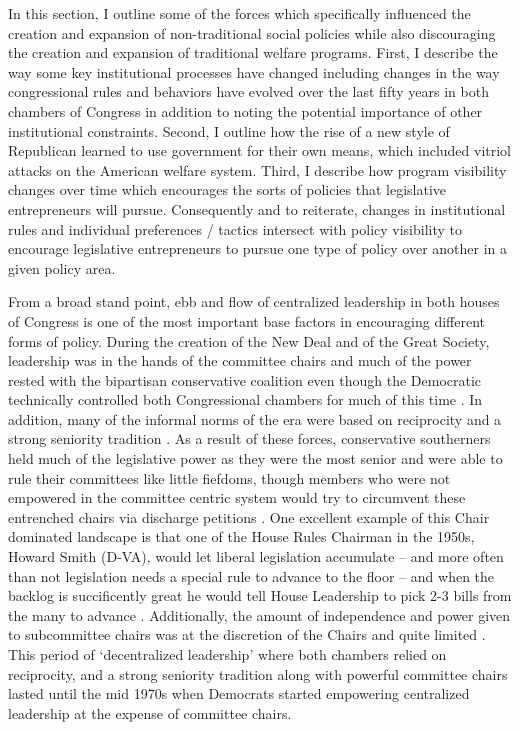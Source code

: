 \documentclass[12pt]{article}
\begin{document}
In this section, I outline some of the forces which specifically influenced the creation and expansion of non-traditional social policies while also discouraging the creation and expansion of traditional welfare programs. First, I describe the way some key institutional processes have changed including changes in the way congressional rules and behaviors have evolved over the last fifty years in both chambers of Congress in addition to noting the potential importance of other institutional constraints. Second, I outline how the rise of a new style of Republican learned to use government for their own means, which included vitriol attacks on the American welfare system. Third, I describe how program visibility changes over time which encourages the sorts of policies that legislative entrepreneurs will pursue. Consequently and to reiterate, changes in institutional rules and individual preferences / tactics intersect with policy visibility to encourage legislative entrepreneurs to pursue one type of policy over another in a given policy area.

From a broad stand point, ebb and flow of centralized leadership in both houses of Congress is one of the most important base factors in encouraging different forms of policy. During the creation of the New Deal and of the Great Society, leadership was in the hands of the committee chairs and much of the power rested with the bipartisan conservative coalition even though the Democratic technically controlled both Congressional chambers for much of this time \citep{shelley1983, shepsle1989, polsby2004}. In addition, many of the informal norms of the era were based on reciprocity and a strong seniority tradition \citep{matthews1960, asher1973}. As a result of these forces, conservative southerners held much of the legislative power as they were the most senior and were able to rule their committees like little fiefdoms, though members who were not empowered in the committee centric system would try to circumvent these entrenched chairs via discharge petitions \citep{pearson2009}. One excellent example of this Chair dominated landscape is that one of the House Rules Chairman in the 1950s, Howard Smith (D-VA), would let liberal legislation accumulate -- and more often than not legislation needs a special rule to advance to the floor -- and when the backlog is succificently great he would tell House Leadership to pick 2-3 bills from the many to advance \cite[pg. 14]{polsby2004}. Additionally, the amount of independence and power given to subcommittee chairs was at the discretion of the Chairs and quite limited \citep{rohde1974}. This period of `decentralized leadership' where both chambers relied on reciprocity, and a strong seniority tradition along with powerful committee chairs lasted until the mid 1970s when Democrats started empowering centralized leadership at the expense of committee chairs.
\end{document}
